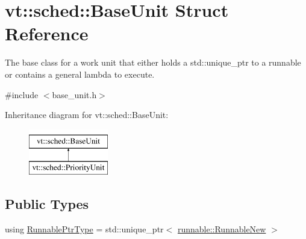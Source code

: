 \hypertarget{structvt_1_1sched_1_1_base_unit}{}\section{vt\+:\+:sched\+:\+:Base\+Unit Struct Reference}
\label{structvt_1_1sched_1_1_base_unit}


The base class for a work unit that either holds a {\ttfamily std\+::unique\+\_\+ptr} to a runnable or contains a general lambda to execute.  




{\ttfamily \#include $<$base\+\_\+unit.\+h$>$}

Inheritance diagram for vt\+:\+:sched\+:\+:Base\+Unit\+:\begin{figure}[H]
\begin{center}
\leavevmode
\includegraphics[height=2.000000cm]{structvt_1_1sched_1_1_base_unit}
\end{center}
\end{figure}
\subsection*{Public Types}
\begin{DoxyCompactItemize}
\item 
using \hyperlink{structvt_1_1sched_1_1_base_unit_a9be5d5adaeb011c8ef82f751485ebf9a}{Runnable\+Ptr\+Type} = std\+::unique\+\_\+ptr$<$ \hyperlink{structvt_1_1runnable_1_1_runnable_new}{runnable\+::\+Runnable\+New} $>$
\end{DoxyCompactItemize}
